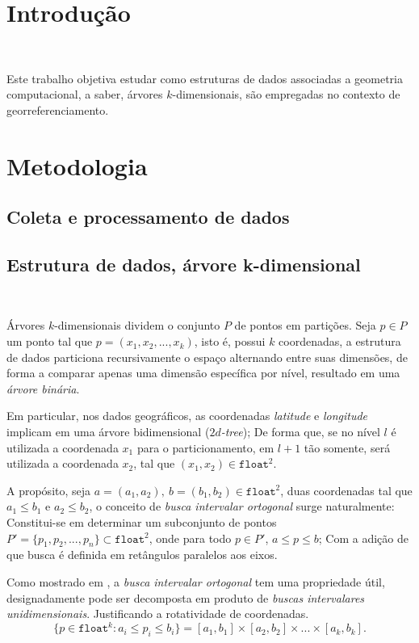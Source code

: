 \documentclass{article}
\begin{document}
\begin{adjustwidth}{-1.5cm}{-1.5cm}

\section{Introdução}
\ 

Este trabalho objetiva estudar como estruturas de dados associadas a geometria computacional, a saber, árvores \(k\)-dimensionais, são empregadas no contexto de georreferenciamento.

\section{Metodologia}
\subsection{Coleta e processamento de dados}

\subsection{Estrutura de dados, árvore k-dimensional}
\ 

Árvores \(k\)-dimensionais dividem o conjunto \(P\) de pontos em partições. Seja \(p \in P\) um ponto tal que \(p=(x_1,x_2,...,x_k)\), isto é, possui \(k\) coordenadas, a estrutura de dados particiona recursivamente o espaço alternando entre suas dimensões, de forma a comparar apenas uma dimensão específica por nível, resultado em uma \textit{árvore binária}.

Em particular, nos dados geográficos, as coordenadas \textit{latitude} e \textit{longitude} implicam em uma árvore bidimensional (\(2d\)\textit{-tree}); De forma que, se no nível \(l\) é utilizada a coordenada \(x_1\) para o particionamento, em \(l+1\) tão somente, será utilizada a coordenada \(x_2\), tal que \((x_1,x_2) \in \texttt{float}^2\).

A propósito, seja \(a=(a_1,a_2),\ b=(b_1,b_2) \in \texttt{float}^2\), duas coordenadas tal que \(a_1\leq b_1\) e \(a_2 \leq b_2\), o conceito de \textit{busca intervalar ortogonal} surge naturalmente: Constitui-se em determinar um subconjunto de pontos \(P'=\{p_1,p_2,...,p_n\} \subset \texttt{float}^2\), onde 
para todo \(p \in P'\), \(a \leq p \leq b\); Com a adição de que busca é definida em retângulos paralelos aos eixos.

Como mostrado em \cite{md}, a \textit{busca intervalar ortogonal} tem uma propriedade útil, designadamente pode ser decomposta em produto de \textit{buscas intervalares unidimensionais}. Justificando a rotatividade de coordenadas.
\[\{p \in \texttt{float}^k : a_i \leq p_i \leq b_i\} = [a_1,b_1] \times[a_2,b_2] \times ... \times [a_k, b_k].\]


\end{adjustwidth}
\end{document}
